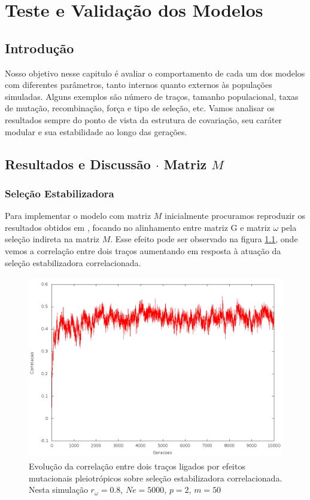 \pagestyle{empty}
\cleardoublepage
\pagestyle{fancy}
\chapter{Teste e Validação dos Modelos}\label{cap3}

\section{Introdução}

Nosso objetivo nesse capitulo é avaliar o comportamento de cada um dos
modelos com diferentes parâmetros, tanto internos quanto
externos às populações simuladas.
Alguns exemplos são número de traços, tamanho populacional, taxas de
mutação, recombinação, força e tipo de seleção, etc. 
Vamos analisar os resultados sempre do ponto de vista da estrutura de
covariação, seu caráter modular e sua estabilidade ao longo das
gerações.


\section{Resultados e Discussão $\cdot$ Matriz $M$}\label{cap3:ModelM}

\subsection{Seleção Estabilizadora}

Para implementar o modelo com matriz $M$ inicialmente procuramos
reproduzir os resultados obtidos em \cite{Jones2007}, focando no
alinhamento entre matriz G e matriz $\omega$ pela seleção indireta na
matriz $M$. 
Esse efeito pode ser observado na figura \ref{jones2tracos}, onde vemos
a correlação entre dois traços aumentando em resposta à atuação da
seleção estabilizadora correlacionada.  

\begin{center}
\begin{figure}[htbp]
  \includegraphics[width=150mm, height=80mm]{figuras/jones2tracos.png}
  \caption{Evolução da correlação entre dois traços ligados por efeitos
  mutacionais pleiotrópicos sobre seleção estabilizadora correlacionada.
  Nesta simulação $r_\omega=0.8$, $Ne=5000$, $p=2$, $m=50$}
  \label{jones2tracos}
\end{figure}
\end{center}

